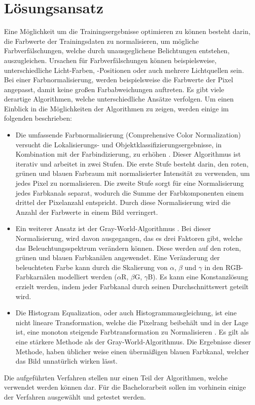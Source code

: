 \documentclass[a4paper,12pt,oneside]{article}
\begin{document}
  \section{Lösungsansatz}
Eine Möglichkeit um die Trainingsergebnisse optimieren zu können besteht darin, die Farbwerte der Trainingsdaten zu normalisieren, um mögliche Farbverfälschungen, welche durch unausgeglichene Belichtungen entstehen, auszugleichen. Ursachen für Farbverfälschungen können beispielsweise, unterschiedliche Licht-Farben, -Positionen oder auch mehrere Lichtquellen sein. Bei einer Farbnormalisierung, werden beispielsweise die Farbwerte der Pixel angepasst, damit keine großen Farbabweichungen auftreten. Es gibt viele derartige Algorithmen, welche unterschiedliche Ansätze verfolgen. Um einen Einblick in die Möglichkeiten der Algorithmen zu zeigen, werden einige im folgenden beschrieben:
  \begin{itemize}
  \item Die umfassende Farbnormalisierung (Comprehensive Color Normalization) versucht die Lokalisierungs- und Objektklassifizierungsergebnisse, in Kombination mit der Farbindizierung, zu erhöhen \cite{finlayson1998comprehensive}. Dieser Algorithmus ist iterativ und arbeitet in zwei Stufen. Die erste Stufe besteht darin, den roten, grünen und blauen Farbraum mit normalisierter Intensität zu verwenden, um jedes Pixel zu normalisieren. Die zweite Stufe sorgt für eine Normalisierung jedes Farbkanals separat, wodurch die Summe der Farbkomponenten einem drittel der Pixelanzahl entspricht. Durch diese Normalisierung wird die Anzahl der Farbwerte in einem Bild verringert.
  \item Ein weiterer Ansatz ist der Gray-World-Algorithmus \cite{buenaposada2001variations}. Bei dieser Normalisierung, wird davon ausgegangen, das es drei Faktoren gibt, welche das Beleuchtungsspektrum verändern können. Diese werden auf den roten, grünen und blauen Farbkanälen angewendet. Eine Veränderung der beleuchteten Farbe kann durch die Skalierung von $\alpha$, $\beta$ und $\gamma$ in den RGB-Farbkarnälen modelliert werden ($\alpha$R, $\beta$G, $\gamma$B). Es kann eine Konstanzlösung erzielt werden, indem jeder Farbkanal durch seinen Durchschnittswert geteilt wird.
  \item Die Histogram Equalization, oder auch Histogrammausgleichung, ist eine nicht lineare Transformation, welche die Pixelrang beibehält und in der Lage ist, eine monoton steigende Farbtransformation zu Normalisieren \cite{goatman2003colour}. Es gilt als eine stärkere Methode als der Gray-World-Algorithmus. Die Ergebnisse dieser Methode, haben üblicher weise einen übermäßigen blauen Farbkanal, welcher das Bild unnatürlich wirken lässt.
  \end{itemize}
Die aufgeführten Verfahren stellen nur einen Teil der Algorithmen, welche verwendet werden können dar. Für die Bachelorarbeit sollen im vorhinein einige der Verfahren ausgewählt und getestet werden.
\end{document}
